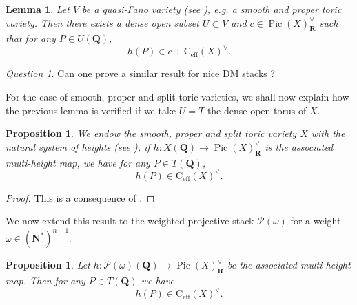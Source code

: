 \documentclass{proc-l}
\newcommand{\R}{\mathbf{R}}
\newcommand{\N}{\mathbf{N}}
\newcommand{\Q}{\mathbf{Q}}
\newcommand{\cone}{\text{C}_{\text{eff}}(X)}
\DeclareMathOperator{\Pic}{Pic}
\newcommand{\stackP}{\mathcal{P}}
\newcommand{\w}{\omega}
\newtheorem{lemma}[theorem]{Lemma}
\newtheorem{prop}[theorem]{Proposition}
\theoremstyle{definition}
\theoremstyle{remark}
\newtheorem{question}[theorem]{Question}
\numberwithin{equation}{section}
\begin{document}
\begin{lemma}
    Let $V$ be a quasi-Fano variety (see \cite[definition 2.10]{bongiorno2024multiheightanalysisrationalpoints}), e.g. a smooth and proper toric variety. Then there exists a dense open subset $U \subset V$ and $c \in \Pic(X)^{\vee}_{\R}$ such that for any $P \in U(\Q)$, $$h(P) \in c + \cone^{\vee} .$$
\end{lemma}

\begin{question}
    Can one prove a similar result for nice DM stacks ?
\end{question}

For the case of smooth, proper and split toric varieties, we shall now explain how the previous lemma is verified if we take $U = T$ the dense open torus of $X$. 

\begin{prop}\label{proposition_lower_bound_toric_variety}
    We endow the smooth, proper and split toric variety $X$ with the natural system of heights (see \cite[Definition 9.2]{salberger_torsor}), if $h : X(\Q) \rightarrow \Pic(X)^{\vee}_{\R}$ is the associated multi-height map, we have for any $P \in T(\Q)$, $$h(P) \in \cone^{\vee} .$$
\end{prop}

\begin{proof}
    This is a consequence of \cite[Proposition 10.24]{salberger_torsor}.
\end{proof}

We now extend this result to the weighted projective stack $\stackP(\w)$ for a weight $\w \in (\N^*)^{n+1}$.

\begin{prop}\label{proposition_lower_bound_weighted_stack}
Let $h : \stackP(\w)(\Q) \rightarrow \Pic(X)^{\vee}_{\R}$ be the associated multi-height map. Then for any $P \in T(\Q)$ we have
\[
h(P) \in \cone^{\vee}.
\]
\end{prop}
\end{document}
